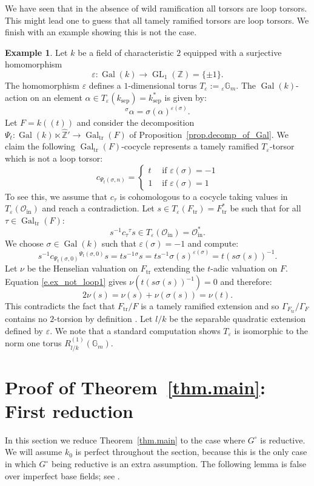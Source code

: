 \documentclass[12pt]{amsart}
\numberwithin{equation}{section}
\theoremstyle{definition}
\newtheorem{example}[theorem]{Example}
\newcommand{\cO}{\mathcal{O}}
\newcommand{\bZ}{\mathbb{Z}}
\newcommand{\Gm}{\mathbb{G}_m}
\newcommand{\Gal}{\operatorname{Gal}}
\newcommand{\GL}{\operatorname{GL}}
\newcommand{\sep}{\operatorname{sep}}
\newcommand{\eps}{\varepsilon}
\newcommand{\tr}{\operatorname{tr}}
\newcommand{\ksep}{k_{\sep}}
\newcommand{\Ftr}{F_{\tr}}
\newcommand{\oin}{\operatorname{in}}
\newcommand{\Oin}{\cO_{\oin}}
\newcommand{\Galtr}{\Gal_{\tr}}
\begin{document}
We have seen that in the absence of wild ramification all torsors are loop torsors. This might lead one to guess that all tamely ramified torsors are loop torsors. We finish with an example showing this is not the case.
\begin{example}
    Let $k$ be a field of characteristic $2$ equipped with a surjective homomorphism $$\eps: \Gal(k) \to \GL_1(\bZ) =\{\pm 1\}.$$ The homomorphism $\eps$ defines a $1$-dimensional torus $T_\eps := {}_\eps \Gm$. The $\Gal(k)$-action on an element $\alpha\in T_\eps(\ksep) = \ksep^*$ is given by:
    $${}^\sigma \alpha = \sigma(\alpha)^{\eps(\sigma)}.$$
    Let $F = k(\!(t)\!)$ and consider the decomposition $\Psi_t: \Gal(k)\ltimes \hat{\bZ}' \to \Galtr(F)$ of Proposition~\ref{prop.decomp_of_Gal}. We claim the following $\Galtr(F)$-cocycle represents a tamely ramified $T_\eps$-torsor which is not a loop torsor:
    $$c_{\Psi_t(\sigma,n)} =  \begin{cases}
        t & \text{ if }\eps(\sigma) = -1 \\
        1 & \text{ if }\eps(\sigma) = 1
    \end{cases}$$
    To see this, we assume that $c_\tau$ is cohomologous to a cocycle taking values in $T_\eps(\Oin)$ and reach a contradiction. Let $s\in T_\eps(\Ftr) = \Ftr^*$ be such that for all $\tau\in \Galtr(F)$: 
    \begin{equation}\label{e.ex_not_loop1}
        s^{-1} c_\tau {}^\tau s \in T_{\eps}(\Oin) = \Oin^{*}.
    \end{equation}
    We choose $\sigma\in \Gal(k)$ such that $\eps(\sigma) =-1$ and compute:
    $$s^{-1}c_{\Psi_t(\sigma,0)} {}^{\Psi_t(\sigma,0)} s = t s^{-1} {}^{\sigma} s = t s^{-1} \sigma(s)^{\eps(\sigma)}=t (s \sigma(s))^{-1}.$$
    Let $\nu$ be the Henselian valuation on $\Ftr$ extending the $t$-adic valuation on $F$. Equation \eqref{e.ex_not_loop1} gives $\nu(t(s \sigma(s))^{-1}) = 0$ and therefore:
    $$2\nu(s) = \nu(s) + \nu(\sigma(s)) = \nu(t).$$
    This contradicts the fact that $\Ftr/F$ is a tamely ramified extension and so $\Gamma_{\Ftr}/\Gamma_F$ contains no $2$-torsion by definition \cite[Appendix A.1]{tignol2015value}. Let $l/k$ be the separable quadratic extension defined by $\eps$. We note that a standard computation shows $T_\eps$ is isomorphic to the norm one torus $R^{(1)}_{l/k}(\Gm)$. 
\end{example}


\section{Proof of Theorem~\ref{thm.main}: First reduction}\label{sect.reduction_to_reductive}
In this section we reduce Theorem~\ref{thm.main} to the case where $G^{\circ}$ is reductive.  We will assume $k_0$ is perfect throughout the section, because this is the only case in which $G^{\circ}$ being reductive is an extra assumption.  The following lemma is false over imperfect base fields; see \cite{tan2013essential}.
\end{document}
